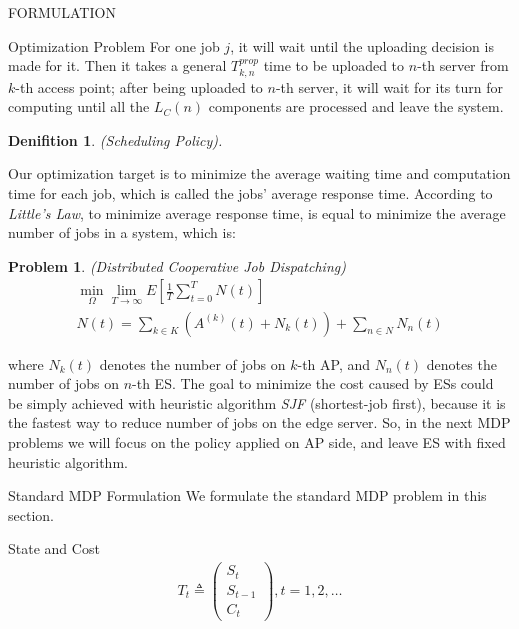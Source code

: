 \documentclass[10pt, conference, letterpaper]{IEEEtran}
\newtheorem{definition}{Denifition}
\newtheorem{problem}{Problem}
\begin{document}
\begin{section}{FORMULATION}
\begin{subsection}{Optimization Problem}
            For one job $j$, it will wait until the uploading decision is made for it. Then it takes a general $T^{prop}_{k,n}$ time to be uploaded to $n$-th server from $k$-th access point; after being uploaded to $n$-th server, it will wait for its turn for computing until all the $L_C(n)$ components are processed and leave the system.

            \begin{definition}
                (Scheduling Policy). 
            \end{definition}
                
            Our optimization target is to minimize the average waiting time and computation time for each job, which is called the jobs' average response time. According to \emph{Little’s Law}, to minimize average response time, is equal to minimize the average number of jobs in a system, which is:
            \begin{problem}
                (Distributed Cooperative Job Dispatching)
                \begin{gather}
                    \min_{\Omega} \lim_{T \to \infty} E[\frac{1}{T} \sum_{t=0}^{T} N(t)]
                    \nonumber\\
                    N(t) = \sum_{k \in K} (A^{(k)}(t) + N_k(t))
                            + \sum_{n \in N} N_n(t)
                \end{gather}
            \end{problem}
            where $N_k(t)$ denotes the number of jobs on $k$-th AP, and $N_n(t)$ denotes the number of jobs on $n$-th ES.
            The goal to minimize the cost caused by ESs could be simply achieved with heuristic algorithm \emph{SJF} (shortest-job first), because it is the fastest way to reduce number of jobs on the edge server. So, in the next MDP problems we will focus on the policy applied on AP side, and leave ES with fixed heuristic algorithm.
        \end{subsection}

        \begin{subsection}{Standard MDP Formulation}
            We formulate the standard MDP problem in this section.

            \begin{subsubsection}{State and Cost}
                \begin{align}
                    T_t \triangleq \begin{pmatrix}
                        S_t \\ S_{t-1} \\ C_t
                    \end{pmatrix}, t=1,2,\dots
                \end{align}


\end{subsubsection}
\end{subsection}
\end{section}
\end{document}
